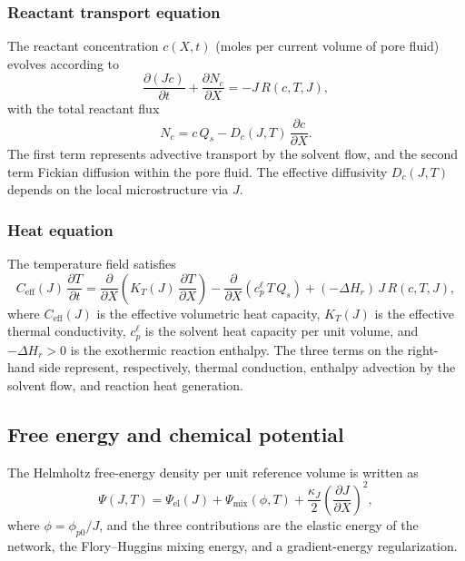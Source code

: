 \documentclass[aps,pre,reprint,superscriptaddress,longbibliography,floatfix]{revtex4-2}
\newcommand{\pp}{\phi_{p0}}
\begin{document}
\subsubsection{Reactant transport equation}

The reactant concentration $c(X,t)$ (moles per current volume of pore fluid) evolves according to
\begin{equation}
  \frac{\partial (Jc)}{\partial t}
  + \frac{\partial N_c}{\partial X}
  = -J\,R(c,T,J),
  \label{eq:c_evol}
\end{equation}
with the total reactant flux
\begin{equation}
  N_c = c\,Q_s - D_c(J,T)\,\frac{\partial c}{\partial X}.
  \label{eq:Nc}
\end{equation}
The first term represents advective transport by the solvent flow, and the second term Fickian diffusion within the pore fluid. The effective diffusivity $D_c(J,T)$ depends on the local microstructure via $J$.

\subsubsection{Heat equation}

The temperature field satisfies
\begin{equation}
  C_\mathrm{eff}(J)\,\frac{\partial T}{\partial t}
  = \frac{\partial}{\partial X}\!\left(K_T(J)\,\frac{\partial T}{\partial X}\right)
  - \frac{\partial}{\partial X}\!\left(c_p^\ell\,T\,Q_s\right)
  + (-\Delta H_r)\,J\,R(c,T,J),
  \label{eq:T_evol}
\end{equation}
where $C_\mathrm{eff}(J)$ is the effective volumetric heat capacity, $K_T(J)$ is the effective thermal conductivity, $c_p^\ell$ is the solvent heat capacity per unit volume, and $-\Delta H_r > 0$ is the exothermic reaction enthalpy. The three terms on the right-hand side represent, respectively, thermal conduction, enthalpy advection by the solvent flow, and reaction heat generation.

\subsection{Free energy and chemical potential}

The Helmholtz free-energy density per unit reference volume is written as
\begin{equation}
  \Psi(J,T) = \Psi_\mathrm{el}(J) + \Psi_\mathrm{mix}(\phi,T)
  + \frac{\kappa_J}{2}\left(\frac{\partial J}{\partial X}\right)^2,
  \label{eq:Psi}
\end{equation}
where $\phi = \pp/J$, and the three contributions are the elastic energy of the network, the Flory--Huggins mixing energy, and a gradient-energy regularization.
\end{document}
